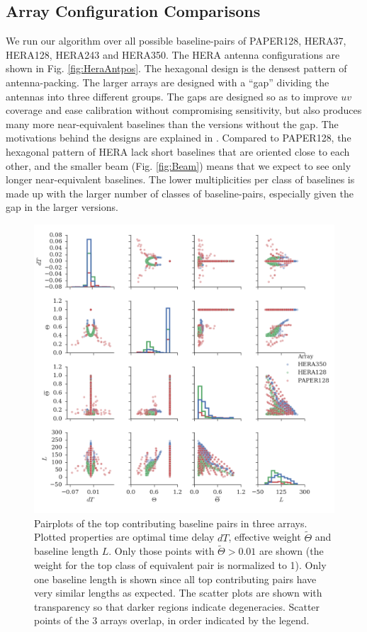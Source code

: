 \documentclass[twocolumn,apj,numberedappendix]{emulateapj}
\renewcommand\[{\begin{equation}}
\renewcommand\]{\end{equation}}
\begin{document}
\subsection{Array Configuration Comparisons \label{sec:arrconf}}
We run our algorithm over all possible baseline-pairs of  PAPER128, HERA37, HERA128, HERA243 and HERA350. The HERA antenna configurations are shown in Fig. \ref{fig:HeraAntpos}. The  
hexagonal design is the densest pattern of antenna-packing. The larger arrays are designed with a ``gap'' dividing the antennas into three different groups. The gaps are designed so as to improve $uv$ coverage and ease calibration without compromising sensitivity, but also produces many more near-equivalent baselines than the versions without the gap. The motivations behind the designs are explained in \cite{HERAconfiguration}.  Compared to PAPER128, the hexagonal pattern of HERA lack short baselines that are oriented close to each other, and the smaller beam (Fig. \ref{fig:Beam}) means that we expect to see only longer near-equivalent baselines. The lower multiplicities per class of baselines is made up with the larger number of classes of baseline-pairs, especially given the gap in the larger versions. 

\begin{figure}[H]
\includegraphics[width=\linewidth]{pairplot}

\caption{Pairplots of the top contributing baseline pairs in three arrays. Plotted properties are optimal time delay $dT$,  effective weight $\widetilde{\Theta}$ and baseline length $L$. Only those points with $\widetilde{\Theta}>0.01$ are shown (the weight for the top class of equivalent pair is normalized to 1). Only one baseline length is shown since all top contributing pairs have very similar lengths as expected. The scatter plots are shown with transparency so that darker regions indicate degeneracies. Scatter points of the 3 arrays overlap, in order indicated by the legend. }
\label{fig:pairplot}
\end{figure}
\end{document}
